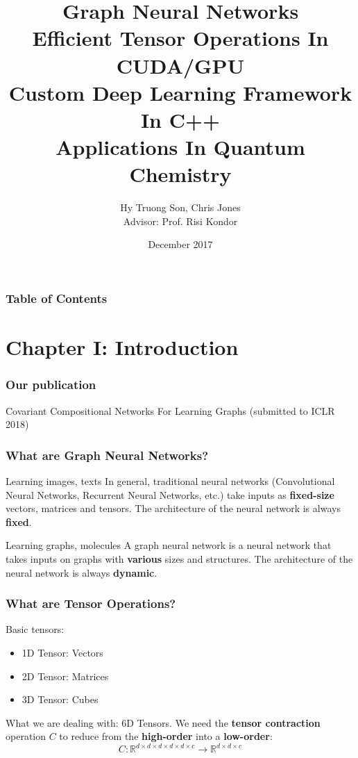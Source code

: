 \documentclass{beamer}
\title[Graph Neural Networks]{Graph Neural Networks \\ Efficient Tensor Operations In CUDA/GPU \\ Custom Deep Learning Framework In C++ \\ Applications In Quantum Chemistry}
\author[Hy et al.]{Hy Truong Son, Chris Jones \\ Advisor: Prof. Risi Kondor}
\institute[UChicago]{The University of Chicago}
\date{December 2017}
\begin{document}

\frame{\titlepage}

\begin{frame}
\frametitle{Table of Contents}
\tableofcontents
\end{frame}

\section{Chapter I: Introduction}

\begin{frame}
\frametitle{Our publication}
Covariant Compositional Networks For Learning Graphs (submitted to ICLR 2018)
\end{frame}

\begin{frame}
\frametitle{What are Graph Neural Networks?}
\begin{block}{Learning images, texts}
In general, traditional neural networks (Convolutional Neural Networks, Recurrent Neural Networks, etc.) take inputs as \textbf{fixed-size} vectors, matrices and tensors. The architecture of the neural network is always \textbf{fixed}.
\end{block}
\begin{alertblock}{Learning graphs, molecules}
A graph neural network is a neural network that takes inputs on graphs with \textbf{various} sizes and structures. The architecture of the neural network is always \textbf{dynamic}.
\end{alertblock}
\end{frame}

\begin{frame}
\frametitle{What are Tensor Operations?}
Basic tensors:
\begin{itemize}
	\item 1D Tensor: Vectors
	\item 2D Tensor: Matrices
	\item 3D Tensor: Cubes
\end{itemize}
What we are dealing with: {\color{red} 6D Tensors}. We need the \textbf{tensor contraction} operation $C$ to reduce from the \textbf{high-order} into a \textbf{low-order}:
$$C: \mathbb{R}^{d \times d \times d \times d \times d \times c} \rightarrow \mathbb{R}^{d \times d \times c}$$
\end{frame}
\end{document}
